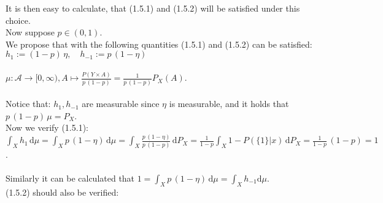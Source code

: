\documentclass{article}
\begin{document}
It is then easy to calculate, that (1.5.1) and (1.5.2) will be satisfied under this choice.\\
Now suppose $p \in (0,1)$. \\
We propose that with the following quantities  (1.5.1) and (1.5.2) can be satisfied: \\
\indent $h_1 := (1-p)\, \eta, \quad h_{-1}:= p\, (1-\eta) \quad $\\
\vspace*{-1em} \\
\indent $\mu : \mathcal{A} \rightarrow [0,\infty) , A \mapsto \displaystyle{ \frac{P(Y\times A)}{p\, (1-p)} = \frac{1}{p\, (1-p)} P_X(A) }$.\\
\vspace*{-1.3em} \\
Notice that:  $h_1, h_{-1}$ are measurable since $\eta$ is measurable, and it holds that $p\, (1-p)\, \mu = P_X$. \\
Now we verify (1.5.1): \\
\indent $\displaystyle{ \int_X h_1 \, \text{d}\mu = \int_X p\, (1-\eta) \, \text{d}\mu = \int_X \frac{p\, (1-\eta)}{p\, (1-p)} \, \text{d}P_X = \frac{1}{1-p}\int_X 1-P(\{1\}|x)\, \text{d}P_X = \frac{1}{1-p} \,(1-p) = 1 }$.\\
\vspace*{-0.5em} \\
Similarly it can be calculated that $ \displaystyle{  1 = \int_X p\, (1-\eta)\,\text{d} \mu = \int_X h_{-1} \text{d} \mu }$.\vspace*{0.6em}\\
(1.5.2) should also be verified\vspace*{-0.3em}: 
\end{document}
